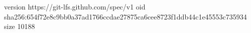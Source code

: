 version https://git-lfs.github.com/spec/v1
oid sha256:654f72e8c9bb0a37ad1766ccdae27875ca6cee8723f1ddb44c1e45553c735934
size 10188
